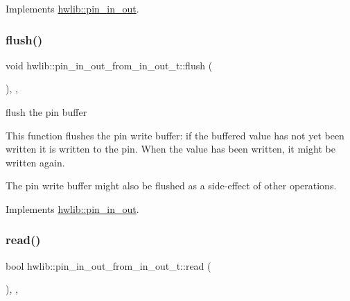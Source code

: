 Implements \hyperlink{classhwlib_1_1pin__in__out_ad08a5f5e9a4c3aadaa7c665b98f2418e}{hwlib\+::pin\+\_\+in\+\_\+out}.

\mbox{\label{classhwlib_1_1pin__in__out__from__in__out__t_a652dca78cb01191780f571b7f31e6e77}} 
\subsubsection{\texorpdfstring{flush()}{flush()}}
{\footnotesize\ttfamily void hwlib\+::pin\+\_\+in\+\_\+out\+\_\+from\+\_\+in\+\_\+out\+\_\+t\+::flush (\begin{DoxyParamCaption}{ }\end{DoxyParamCaption})\hspace{0.3cm}{\ttfamily [inline]}, {\ttfamily [override]}, {\ttfamily [virtual]}}

flush the pin buffer

This function flushes the pin write buffer\+: if the buffered value has not yet been written it is written to the pin. When the value has been written, it might be written again.

The pin write buffer might also be flushed as a side-\/effect of other operations. 

Implements \hyperlink{classhwlib_1_1pin__in__out_a5207c9e30f0c88e4c052952397c2da88}{hwlib\+::pin\+\_\+in\+\_\+out}.

\mbox{\label{classhwlib_1_1pin__in__out__from__in__out__t_ae1a321c11a2691bb6068e18835add2de}} 
\subsubsection{\texorpdfstring{read()}{read()}}
{\footnotesize\ttfamily bool hwlib\+::pin\+\_\+in\+\_\+out\+\_\+from\+\_\+in\+\_\+out\+\_\+t\+::read (\begin{DoxyParamCaption}{ }\end{DoxyParamCaption})\hspace{0.3cm}{\ttfamily [inline]}, {\ttfamily [override]}, {\ttfamily [virtual]}}

